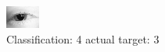 \begin{figure}[h!]
\begin{center}
\includegraphics[width=0.60\columnwidth]{figures/ID68_class_4_target_3.png}
\end{center}
\caption{ Classification: 4 actual target: 3}
\label{fig:ID68_class_4_target_3}
\end{figure}
